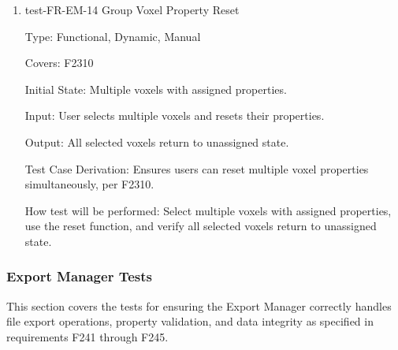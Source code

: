 \documentclass[12pt, titlepage]{article}
\begin{document}
\begin{enumerate}
\item{test-FR-EM-14 Group Voxel Property Reset\\}

Type: Functional, Dynamic, Manual

Covers: F2310
					
Initial State: Multiple voxels with assigned properties.
					
Input: User selects multiple voxels and resets their properties.
					
Output: All selected voxels return to unassigned state.

Test Case Derivation: Ensures users can reset multiple voxel properties simultaneously, per F2310.
					
How test will be performed: Select multiple voxels with assigned properties, use the reset function, and verify all selected voxels return to unassigned state.


\end{enumerate}


\subsubsection{Export Manager Tests}

This section covers the tests for ensuring the Export Manager correctly
handles file export operations, property validation, and data integrity
as specified in requirements F241 through F245.
\end{document}
